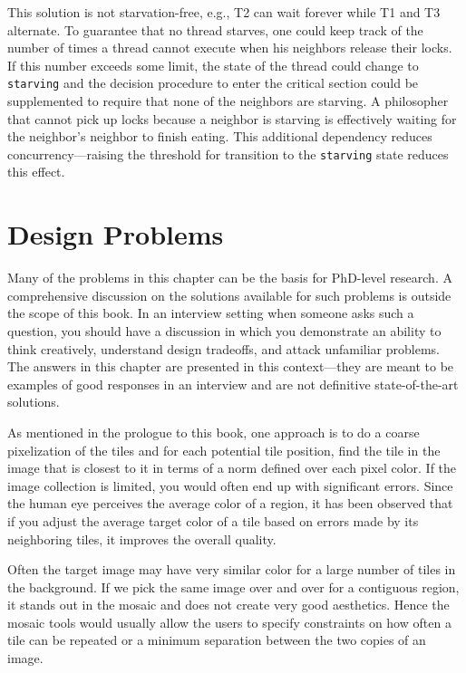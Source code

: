 This solution is not starvation-free, e.g., 
T2 can wait forever while T1 and T3 alternate.
To guarantee that no thread starves, one could keep track of the
number of times a thread cannot execute when his neighbors release their locks.
If this number exceeds some limit, the state of the thread
could change to \texttt{starving} and the decision procedure to enter the critical
section could be supplemented to require that none of the neighbors are starving.  
A philosopher that cannot pick up locks because a neighbor is starving 
is effectively waiting for the neighbor's neighbor to finish eating. 
This additional dependency reduces concurrency---raising the threshold for 
transition to the \texttt{starving} state reduces this effect.


\chapter{ Design Problems}
Many of the problems in this chapter can be the basis for PhD-level research.
A comprehensive discussion on the solutions available for such problems is 
outside the scope of this book.  In an interview setting when someone asks such
a question, you should have a discussion in which
you demonstrate an ability to think creatively, understand design
tradeoffs, and attack unfamiliar problems. The
answers in this chapter are presented in this context---they
are meant to be examples of good responses in an
interview and are not definitive state-of-the-art solutions.

As mentioned in the prologue to this book, one approach
is to do a coarse pixelization of the tiles and for each
potential tile position, find the tile in the image that is closest to
it in terms of a norm defined over each pixel color. If the image
collection is limited, you would often end up with significant
errors. Since the human eye perceives the average color of a region, it
has been observed that if you adjust the average target color of a
tile based on errors made by its neighboring tiles, it improves the
overall quality.

Often the target image may have very similar color for a large number
of tiles in the background. If we pick the same image over and over
for a contiguous region, it stands out in the mosaic and does not create
very good aesthetics. Hence the mosaic tools would usually allow the
users to specify constraints on how often a tile can be repeated or
a minimum separation between the two copies of an image.


